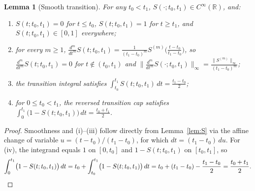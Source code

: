 \documentclass[11pt]{article}
\newtheorem{lemma}[theorem]{Lemma}
\newcommand{\R}{\mathbb{R}}
\begin{document}
\begin{lemma}[Smooth transition]
\label{lem:trans}
For any $t_0 < t_1$, $S(\cdot; t_0, t_1) \in C^\infty(\R)$, and:
\begin{enumerate}
\item[(i)] $S(t; t_0, t_1) = 0$ for $t \le t_0$, $S(t; t_0, t_1) = 1$ for $t \ge t_1$, and $S(t; t_0, t_1) \in [0, 1]$ everywhere;
\item[(ii)] for every $m \ge 1$, $\frac{d^m}{dt^m}S(t; t_0, t_1) = \frac{1}{(t_1-t_0)^m}S^{(m)}\bigl(\frac{t-t_0}{t_1-t_0}\bigr)$, so $\frac{d^m}{dt^m}S(t; t_0, t_1) = 0$ for $t \notin (t_0, t_1)$ and $\|\frac{d^m}{dt^m}S(\cdot; t_0, t_1)\|_\infty = \frac{\|S^{(m)}\|_\infty}{(t_1-t_0)^m}$;
\item[(iii)] the transition integral satisfies $\int_{t_0}^{t_1} S(t; t_0, t_1)\,dt = \frac{t_1-t_0}{2}$;
\item[(iv)] for $0 \le t_0 < t_1$, the reversed transition cap satisfies $\int_0^{t_1} \bigl(1 - S(t; t_0, t_1)\bigr)\,dt = \frac{t_0+t_1}{2}$.
\end{enumerate}
\end{lemma}

\begin{proof}
Smoothness and (i)--(iii) follow directly from Lemma~\ref{lem:S} via the affine change of variable $u = (t-t_0)/(t_1-t_0)$, for which $dt = (t_1-t_0)\,du$.
For (iv), the integrand equals $1$ on $[0, t_0]$ and $1-S(t; t_0, t_1)$ on $[t_0, t_1]$, so
\[
\int_0^{t_1} \bigl(1 - S(t; t_0, t_1)\bigr)\,dt = t_0 + \int_{t_0}^{t_1} \bigl(1 - S(t; t_0, t_1)\bigr)\,dt = t_0 + (t_1-t_0) - \frac{t_1-t_0}{2} = \frac{t_0+t_1}{2}. \qedhere
\]
\end{proof}
\end{document}
